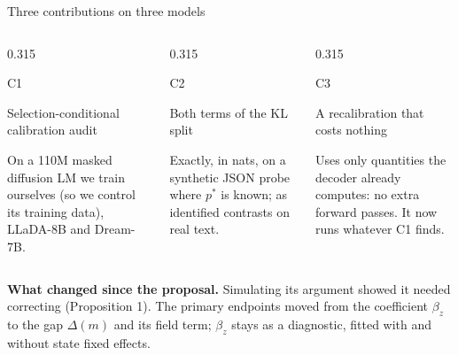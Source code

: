 \documentclass[aspectratio=169,10pt,t]{beamer}
\newcommand{\paneltitle}[1]{{\color{accentdark}\small\firasemibold #1}\par\vspace{0.8mm}}
\begin{document}
\begin{frame}{Three contributions on three models}
  \vspace{2mm}
  \begin{columns}[T,onlytextwidth]
    \begin{column}{0.315\textwidth}
      \begin{panel}[height=29mm]
        {\color{accent}\fontsize{16}{18}\selectfont\firasemibold C1}\par\vspace{0.8mm}
        \paneltitle{Selection-conditional calibration audit}
        On a 110M masked diffusion LM we train ourselves (so we control its training data),
        LLaDA-8B and Dream-7B.
      \end{panel}
    \end{column}
    \begin{column}{0.315\textwidth}
      \begin{panel}[height=29mm]
        {\color{accent}\fontsize{16}{18}\selectfont\firasemibold C2}\par\vspace{0.8mm}
        \paneltitle{Both terms of the KL split}
        Exactly, in nats, on a synthetic JSON probe where $p^{*}$ is known; as identified
        contrasts on real text.
      \end{panel}
    \end{column}
    \begin{column}{0.315\textwidth}
      \begin{panel}[height=29mm]
        {\color{accent}\fontsize{16}{18}\selectfont\firasemibold C3}\par\vspace{0.8mm}
        \paneltitle{A recalibration that costs nothing}
        Uses only quantities the decoder already computes: no extra forward passes. It now
        runs whatever C1 finds.
      \end{panel}
    \end{column}
  \end{columns}
  \vspace{3mm}
  \begin{takeaway}
    \textbf{What changed since the proposal.} Simulating its argument showed it needed
    correcting (Proposition 1). The primary endpoints moved from the coefficient $\beta_z$ to
    the gap $\Delta(m)$ and its field term; $\beta_z$ stays as a diagnostic, fitted with and
    without state fixed effects.
  \end{takeaway}
\end{frame}
\end{document}
